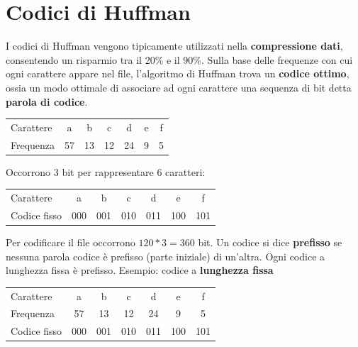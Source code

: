 \section{Codici di Huffman}

I codici di Huffman vengono tipicamente utilizzati nella \textbf{compressione dati}, consentendo un risparmio tra il 20\% e il 90\%. Sulla base delle frequenze con cui ogni carattere appare nel file, l'algoritmo di Huffman trova un \textbf{codice ottimo}, ossia un modo ottimale di associare ad ogni carattere una sequenza di bit detta \textbf{parola di codice}.

\begin{center}
\begin{tabular}[htpd]{| l | c c c c c c |}

\hline
Carattere & a & b & c & d & e & f \\
Frequenza & 57 & 13 & 12 & 24 & 9 & 5 \\
\hline

\end{tabular}
\end{center}

Occorrono 3 bit per rappresentare 6 caratteri:

\begin{center}
\begin{tabular}[htpd]{| l | c c c c c c |}

\hline
Carattere & a & b & c & d & e & f \\
Codice fisso & 000 & 001 & 010 & 011 & 100 & 101 \\
\hline

\end{tabular}
\end{center}

Per codificare il file occorrono $120*3=360$ bit.
\linebreak
\linebreak
Un codice si dice \textbf{prefisso} se nessuna parola codice è prefisso (parte iniziale) di un'altra. Ogni codice a lunghezza fissa è prefisso.
\linebreak
\linebreak
Esempio: codice a \textbf{lunghezza fissa}

\begin{center}
\begin{tabular}[htpd]{| l | c c c c c c |}

\hline
Carattere & a & b & c & d & e & f \\
Frequenza & 57 & 13 & 12 & 24 & 9 & 5 \\
Codice fisso & 000 & 001 & 010 & 011 & 100 & 101 \\
\hline

\end{tabular}
\end{center}

